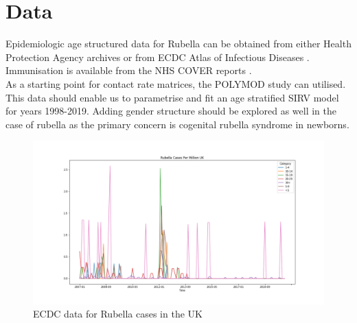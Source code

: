\documentclass{article}
\theoremstyle{definition}
\begin{document}
\section{Data}
Epidemiologic age structured data for Rubella can be obtained from either Health Protection Agency archives \cite{agency_epidemiological_nodate} or from ECDC Atlas of Infectious Diseases \cite{noauthor_surveillance_nodate}.\\
Immunisation is available from the NHS COVER reports \cite{noauthor_childhood_nodate}.\\
As a starting point for contact rate matrices, the POLYMOD study \cite{mossong_social_2008} can utilised.\\
This data should enable us to parametrise and fit an age stratified SIRV model for years 1998-2019. Adding gender structure should be explored as well in the case of rubella as the primary concern is cogenital rubella syndrome in newborns. 
\center
\begin{figure}
  [h] 
  \includegraphics[width=1 
  \textwidth]{../data_nb/Rubella20072018}
  \caption{ECDC data for Rubella cases in the UK}
\end{figure}
\newpage
\printbibliography  
\end{document}
